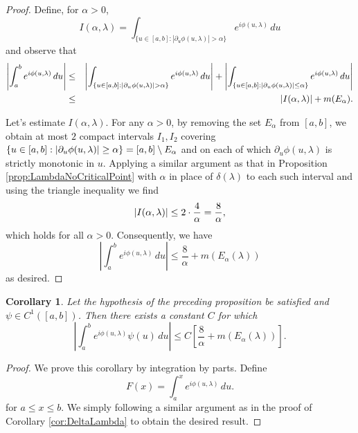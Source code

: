 \documentclass[11pt]{article}
\newtheorem{corollary}[theorem]{Corollary}
\newcommand{\lb}{\left[}
\newcommand{\rb}{\right]}
\newcommand{\p}{\partial}
\newcommand{\f}[2]{\frac{#1}{#2}}
\newcommand{\al}{\alpha}
\begin{document}
\begin{proof}
Define, for $\alpha>0$,
\begin{equation*}
    I(\alpha, \lambda)=\int_{\{u\in[a,b]:|\p_u \phi(u,\lambda)|> \alpha\}}e^{i\phi(u,\lambda)}\,du
\end{equation*}
and observe that
\begin{eqnarray*}
    \abs{\int_a^b e^{i\phi(u,\lambda)} \,du}
    &\leq&  \abs{\int_{\{u\in[a,b]:|\p_u\phi(u,\lambda)|> \alpha\}}e^{i\phi(u,\lambda)}\,du}
    + 
    \abs{\int_{\{ u \in [a,b]: \abs{\p_u\phi(u,\lambda)} \leq \al \}}e^{i\phi(u,\lambda)} \,du } \\
    &\leq& \abs{I(\alpha,\lambda)}  + m(E_\al).
\end{eqnarray*}

Let's estimate $I(\al,\lambda)$. For any $\alpha>0$, by removing the set $E_\alpha$ from $[a,b]$, we obtain at most $2$ compact intervals $I_1,I_2$ covering $\{ u\in [a,b] : \abs{\p_u \phi(u,\lambda)} \geq\alpha \}=[a,b]\setminus E_\alpha$ and on each of which $\p_u\phi(u,\lambda)$ is strictly monotonic in $u$. Applying a similar argument as that in Proposition \ref{prop:LambdaNoCriticalPoint} with $\al$ in place of $\delta(\lambda)$ to each such interval and using the triangle inequality we find 
\begin{equation*}
    \abs{I(\alpha,\lambda)} \leq  2\cdot \f{4}{\al} = \f{8}{\al},
\end{equation*}
which holds for all $\alpha>0$. Consequently, we have
\begin{equation*}
\left|\int_a^b e^{i\phi(u,\lambda)}\,du\right| \leq \frac{8}{\alpha}+m(E_\alpha(\lambda))
\end{equation*}
as desired.
\end{proof}



\begin{corollary}\label{cor:LambdaPsiPhi}
Let the hypothesis of the preceding proposition be satisfied and $\psi \in C^1([a,b])$. Then there exists a constant $C$ for which  
\begin{equation*}
\left|\int_a^b e^{i\phi(u,\lambda)}\psi(u) \,du\right| \leq  C\lb \frac{8}{\alpha}+m(E_\alpha(\lambda))\rb .
\end{equation*}
\end{corollary}


\begin{proof}
We prove this corollary by integration by parts. Define
\begin{equation*}
    F(x) = \int_a^x e^{i \phi(u,\lambda)}\,du.
\end{equation*}
for $a\leq x\leq b$. We simply following a similar argument as in the proof of Corollary \ref{cor:DeltaLambda} to obtain the desired result.
\end{proof}
\end{document}
